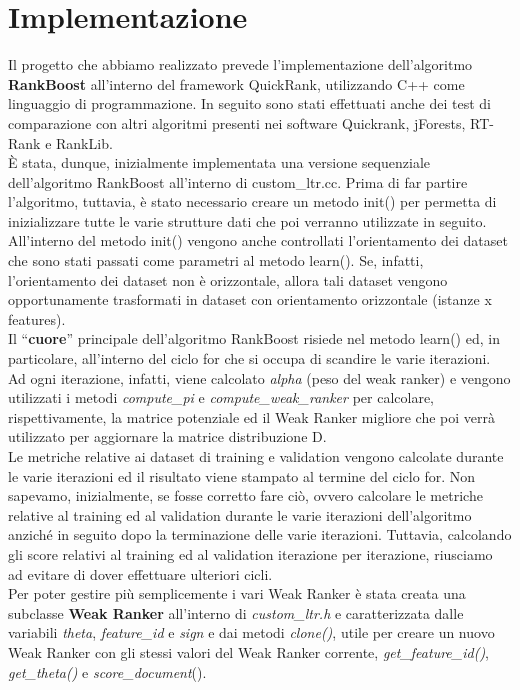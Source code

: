 \chapter*{Implementazione}

Il progetto che abbiamo realizzato prevede l'implementazione dell'algoritmo \textbf{RankBoost} all'interno del framework QuickRank, utilizzando C++ come linguaggio di programmazione. In seguito sono stati effettuati anche dei test di comparazione con altri algoritmi presenti nei software Quickrank, jForests, RT-Rank e RankLib.\\
È stata, dunque, inizialmente implementata una versione sequenziale dell'algoritmo RankBoost all'interno di custom\_ltr.cc. Prima di far partire l'algoritmo, tuttavia, è stato necessario creare un metodo init() per permetta di inizializzare tutte le varie strutture dati che poi verranno utilizzate in seguito. All'interno del metodo init() vengono anche controllati l'orientamento dei dataset che sono stati passati come parametri al metodo learn(). Se, infatti, l'orientamento dei dataset non è orizzontale, allora tali dataset vengono opportunamente trasformati in dataset con orientamento orizzontale (istanze x features).\\
Il ``\textbf{cuore}'' principale dell'algoritmo RankBoost risiede nel metodo learn() ed, in particolare, all'interno del ciclo for che si occupa di scandire le varie iterazioni. Ad ogni iterazione, infatti, viene calcolato \textit{alpha} (peso del weak ranker) e vengono utilizzati i metodi \textit{compute\_pi} e \textit{compute\_weak\_ranker} per calcolare, rispettivamente, la matrice potenziale ed il Weak Ranker migliore che poi verrà utilizzato per aggiornare la matrice distribuzione D.\\
Le metriche relative ai dataset di training e validation vengono calcolate durante le varie iterazioni ed il risultato viene stampato al termine del ciclo for. Non sapevamo, inizialmente, se fosse corretto fare ciò, ovvero calcolare le metriche relative al training ed al validation durante le varie iterazioni dell'algoritmo anziché in seguito dopo la terminazione delle varie iterazioni. Tuttavia, calcolando gli score relativi al training ed al validation iterazione per iterazione, riusciamo ad evitare di dover effettuare ulteriori cicli.\\
Per poter gestire più semplicemente i vari Weak Ranker è stata creata una subclasse \textbf{Weak Ranker} all'interno di \textit{custom\_ltr.h} e caratterizzata dalle variabili \textit{theta}, \textit{feature\_id} e \textit{sign} e dai metodi \textit{clone()}, utile per creare un nuovo Weak Ranker con gli stessi valori del Weak Ranker corrente, \textit{get\_feature\_id()}, \textit{get\_theta()} e \textit{score\_document}().\\
